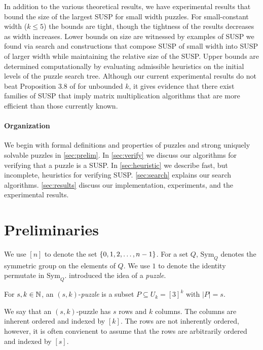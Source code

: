 \documentclass[11pt]{article}
\newcommand\sse{\subseteq}
\newcommand\Sym[1]{\ensuremath{\mathrm{Sym}_{#1}}}
\begin{document}

In addition to the various theoretical results, we have experimental
results that bound the size of the largest SUSP for small width
puzzles.  For small-constant width ($k \le 5$) the bounds are tight,
though the tightness of the results decreases as width increases.
Lower bounds on size are witnessed by examples of SUSP we found via
search and constructions that compose SUSP of small width into SUSP of
larger width while maintaining the relative size of the SUSP.  Upper
bounds are determined computationally by evaluating admissible
heuristics on the initial levels of the puzzle search tree.  Although
our current experimental results do not beat Proposition 3.8 of
\cite{cksu05} for unbounded $k$, it gives evidence that there exist
families of SUSP that imply matrix multiplication algorithms that are
more efficient than those currently known.

\paragraph{Organization}
We begin with formal definitions and properties of puzzles and strong
uniquely solvable puzzles in \autoref{sec:prelim}.  In
\autoref{sec:verify} we discuss our algorithms for verifying that a
puzzle is a SUSP.  In \autoref{sec:heuristic} we describe fast,
but incomplete, heuristics for verifying SUSP.
\autoref{sec:search} explains our search algorithms.
\autoref{sec:results} discuss our implementation, experiments, and
the experimental results.


\section{Preliminaries}
\label{sec:prelim}

\newcommand\ordset[1]{\ensuremath{[#1]}}

We use $\ordset{n}$ to denote the set $\left\{ 0,1,2,\ldots, n-1 \right\}$.  For
a set $Q$, $\Sym{Q}$ denotes the symmetric group on the elements of
$Q$.  We use $1$ to denote the identity permutate in
$\Sym{Q}$. \cite{cksu05} introduced the idea of a \emph{puzzle}.

\begin{definition}[Puzzle]
  For $s, k \in \mathbb{N}$, an $(s,k)$-\emph{puzzle} is a
  subset $P \sse U_k = \ordset{3}^k$ with $|P| = s$.
\end{definition}

We say that an $(s,k)$-puzzle has $s$ rows and $k$ columns.  The
columns are inherent ordered and indexed by $\ordset{k}$.  The rows are not
inherently ordered, however, it is often convienent to assume that the
rows are arbitrarily ordered and indexed by $\ordset{s}$.
\end{document}
